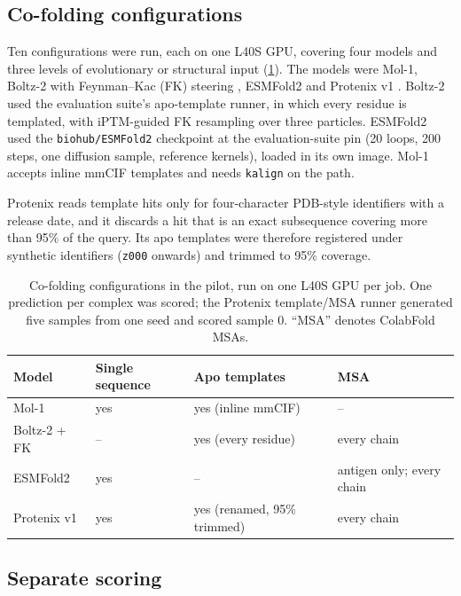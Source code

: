 \documentclass[11pt,a4paper]{article}
\begin{document}
\subsection{Co-folding configurations}

Ten configurations were run, each on one L40S GPU, covering four models and three levels of evolutionary or structural input (\cref{tab:configs}).
The models were Mol-1, Boltz-2 with Feynman--Kac (FK) steering \cite{boltz2}, ESMFold2 \cite{esmfold2} and Protenix v1 \cite{protenix}.
Boltz-2 used the evaluation suite's apo-template runner, in which every residue is templated, with iPTM-guided FK resampling over three particles.
ESMFold2 used the \texttt{biohub/ESMFold2} checkpoint at the evaluation-suite pin (20 loops, 200 steps, one diffusion sample, reference kernels), loaded in its own image.
Mol-1 accepts inline mmCIF templates and needs \texttt{kalign} on the path.

Protenix reads template hits only for four-character PDB-style identifiers with a release date, and it discards a hit that is an exact subsequence covering more than 95\% of the query.
Its apo templates were therefore registered under synthetic identifiers (\texttt{z000} onwards) and trimmed to 95\% coverage.

\begin{table}[ht]
\centering
\caption{Co-folding configurations in the pilot, run on one L40S GPU per job. One prediction per complex was scored; the Protenix template/MSA runner generated five samples from one seed and scored sample 0. ``MSA'' denotes ColabFold MSAs.}
\label{tab:configs}
\small
\begin{tabularx}{\textwidth}{@{}lXXX@{}}
\toprule
Model & Single sequence & Apo templates & MSA \\
\midrule
Mol-1 & yes & yes (inline mmCIF) & -- \\
Boltz-2 + FK & -- & yes (every residue) & every chain \\
ESMFold2 & yes & -- & antigen only; every chain \\
Protenix v1 & yes & yes (renamed, 95\% trimmed) & every chain \\
\bottomrule
\end{tabularx}
\end{table}

\subsection{Separate scoring}
\end{document}
